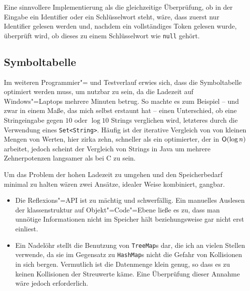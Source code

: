 \documentclass[10pt,a4paper,ngerman,titlepage,tocindentauto]{scrartcl}
\begin{document}
			Eine sinnvollere Implementierung als die gleichzeitige Überprüfung, ob in der Eingabe ein Identifier oder
			ein Schlüsselwort steht, wäre, dass zuerst nur Identifier gelesen werden und, nachdem ein vollständiges
			Token gelesen wurde, überprüft wird, ob dieses zu einem Schlüsselwort wie \texttt{null} gehört.
	
		\subsection{Symboltabelle}
			Im weiteren Programmier"= und Testverlauf erwies sich, dass die Symboltabelle optimiert werden muss, um
			nutzbar zu sein, da die Ladezeit auf Windows"=Laptops mehrere Minuten betrug. So machte es zum Beispiel -- und zwar in einem Maße,
			das mich selbst erstaunt hat -- einen Unterschied, ob eine Stringeingabe gegen $10$ oder $\log 10$ Strings verglichen
			wird, letzteres durch die Verwendung eines \verb|Set<String>|. Häufig ist der iterative Vergleich von von kleinen
			Mengen von Werten, hier zirka zehn, schneller als ein optimierter, der in $\textsf O\!\left(\log n\right)$ arbeitet,
			jedoch scheint der Vergleich von Strings in Java um mehrere Zehnerpotenzen langsamer als bei C zu sein.
			
			Um das Problem der hohen Ladezeit zu umgehen und den Speicherbedarf minimal zu halten wären zwei Ansätze,
			idealer Weise kombiniert, gangbar.
			\begin{itemize}
				\item
					Die Reflexions"=API ist zu mächtig und schwerfällig. Ein manuelles Auslesen der klassenstruktur
					auf Objekt"=Code"=Ebene ließe es zu, dass man unnötige Informationen nicht im Speicher hält beziehungsweise
					gar nicht erst einliest.
				\item
					Ein Nadelöhr stellt die
					Benutzung von \texttt{TreeMap}s dar, die ich an vielen Stellen verwende, da sie im Gegensatz zu \texttt{HashMap}s
					nicht die Gefahr von Kollisionen in sich bergen. Vermutlich ist die Datenmenge klein genug, so dass es zu keinen
					Kollisionen der Streuwerte käme. Eine Überprüfung dieser Annahme wäre jedoch erforderlich.
			\end{itemize}
	
\end{document}
